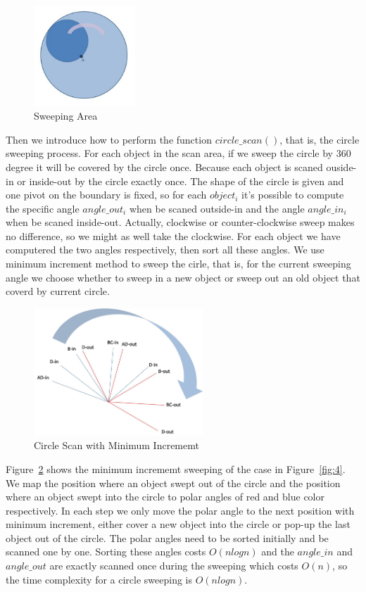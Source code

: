 \documentclass{sig-alternate}
\begin{document}
\begin{figure}\label{fig:5}
\begin{center}
\includegraphics[width=1.5in]{figure/fig5}
\caption{Sweeping Area}
\end{center}
\end{figure}

Then we introduce how to perform the function $circle\_scan()$, that is, the circle
sweeping process. For each object in the scan area, if we sweep the circle by $360$
degree it will be covered by the circle once. Because each object is scaned
ouside-in or inside-out by the circle exactly once. The shape of the circle is
given and one pivot on the boundary is fixed, so for each $object_i$ it's possible
to compute the specific angle $angle\_out_i$ when be scaned outside-in and the
angle $angle\_in_i$ when be scaned inside-out. Actually, clockwise or
counter-clockwise sweep makes no difference, so we might as well take the clockwise.
For each object we have computered the two angles respectively, then sort all these angles. 
We use minimum increment method to sweep the cirle, that is, for the current sweeping
angle  we choose whether to sweep in a new object or sweep out an old
object that coverd by current circle.

\begin{figure}\label{fig:7}
\begin{center}
\includegraphics[width=2.5in]{figure/fig7}
\caption{Circle Scan with Minimum Incrememt}
\end{center}
\end{figure}

Figure~\ref{fig:7} shows the minimum incrememt sweeping of the case in Figure~\ref{fig:4}.
We map the position where an object swept out of the circle and the position where
an object swept into the circle to polar angles of red and blue color respectively.
In each step we only move the polar angle to the next position with minimum increment,
either cover a new object into the circle or pop-up the last object out of the circle.
The polar angles need to be sorted initially and be scanned one by one. 
Sorting these angles costs $O(nlogn)$ and the $angle\_in$ and $angle\_out$ are exactly
scanned once during the sweeping which costs $O(n)$, so the time complexity for a circle sweeping is $O(nlogn)$.
\end{document}
